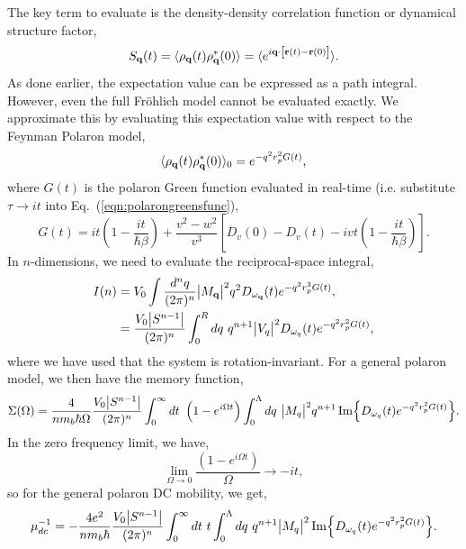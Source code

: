 The key term to evaluate is the density-density correlation function or dynamical structure factor,
\begin{equation}
    S_{\vb{q}}(t) = \langle \rho_{\vb{q}}(t) \rho^*_{\vb{q}}(0) \rangle = \langle e^{i \vb{q} \cdot \left[ \vb{r}(t) - \vb{r}(0) \right]} \rangle.
\end{equation}
As done earlier, the expectation value can be expressed as a path integral. However, even the full Fr\"ohlich model cannot be evaluated exactly. We approximate this by evaluating this expectation value with respect to the Feynman Polaron model,
\begin{equation}
    \langle \rho_{\vb{q}}(t) \rho^*_{\vb{q}}(0) \rangle_0 = e^{-q^2 r_p^2 G(t)},
\end{equation}
where $G(t)$ is the polaron Green function evaluated in real-time (i.e. substitute $\tau \to it$ into Eq.~(\ref{eqn:polarongreensfunc}),
\begin{equation}
    G(t) = i t \left(1 - \frac{i t}{\hbar \beta} \right) + \frac{v^2 - w^2}{v^3} \left[ D_v(0) - D_v(t)  - i v t \left(1 - \frac{i t}{\hbar \beta} \right) \right].
\end{equation}
In $n$-dimensions, we need to evaluate the reciprocal-space integral,
\begin{equation}
    \begin{aligned}
        I(n) &= V_0 \int \frac{d^n q}{(2\pi)^n} \abs{M_{\vb{q}}}^2 q^2 D_{\omega_{\vb{q}}}(t) e^{-q^2 r_p^2 G(t)}, \\
        &= \frac{V_0 \abs{S^{n-1}}}{(2\pi)^n} \int_0^R dq\ q^{n+1} \abs{V_{q}}^2 D_{\omega_{q}}(t) e^{-q^2 r_p^2 G(t)} ,
    \end{aligned}
\end{equation}
where we have used that the system is rotation-invariant. For a general polaron model, we then have the memory function,
\begin{equation}
    \Sigma(\Omega) = \frac{4}{n m_b\hbar\Omega} \frac{V_0 \abs{S^{n-1}}}{(2\pi)^n} \int_0^\infty dt\ \left(1 - e^{i \Omega t}\right) \int_0^\Lambda dq\ \abs{M_{q}}^2 q^{n+1} \Im{D_{\omega_q}(t) e^{-q^2 r_p^2 G(t)}}.
\end{equation}
In the zero frequency limit, we have,
\begin{equation}
    \lim_{\Omega \to 0} \frac{\left(1 - e^{i \Omega t}\right)}{\Omega} \to -i t,
\end{equation}
so for the general polaron DC mobility, we get,
\begin{equation}
    \mu_{dc}^{-1} = -\frac{4 e^2}{n m_b \hbar} \frac{V_0 \abs{S^{n-1}}}{(2\pi)^n} \int_0^\infty dt\ t \int_0^\Lambda dq\ q^{n+1} \abs{M_{q}}^2 \Im{ D_{\omega_{q}}(t) e^{-q^2 r_p^2 G(t)}} .
\end{equation}

